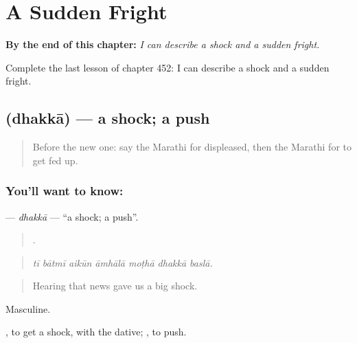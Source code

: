 
\chapter{A Sudden Fright}
\label{ch:mr-a-sudden-fright}

\begin{chapteropening}
\textbf{By the end of this chapter:} \emph{I can describe a shock and a sudden fright.}

Complete the last lesson of chapter 452: I can describe a shock and a sudden fright.
\end{chapteropening}

\section[\texorpdfstring{\mr{धक्का} (dhakkā)}{धक्का (dhakkā)}]{ (dhakkā) — a shock; a push}

\label{lesson:MR-C452-dhakka}



\begin{quote}
Before the new one: say the Marathi for displeased, then the Marathi for to get fed up.
\end{quote}

\subsection*{You'll want to know: }
\textbf{} — \emph{dhakkā} — \textquotedblleft{}a shock; a push\textquotedblright{}.

\begin{quote}
      .
\end{quote}

\begin{quote}
\emph{tī bātmī aikūn āmhālā moṭhā dhakkā baslā.}
\end{quote}

\begin{quote}
Hearing that news gave us a big shock.
\end{quote}

Masculine.

 , to get a shock, with the dative;  , to push.

